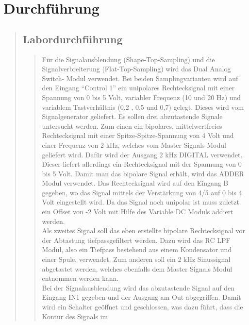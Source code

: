 

\section{Durchführung}
\begin{quote}
    
    
    \subsection{Labordurchführung}
    \begin{quote}
     Für die Signalausblendung (Shape-Top-Sampling) und die Signalverbreiterung (Flat-Top-Sampling) wird das Dual
     Analog Switch- Modul verwendet.
     Bei beiden Samplingvarianten wird auf den Eingang "`Control 1"' ein unipolares Rechtecksignal mit einer Spannung von 0
     bis 5 Volt, variabler Frequenz (10 und 20 Hz) und variablem Tastverhältnis (0,2 , 0,5 und 0,7) gelegt. Dieses wird
     vom Signalgenerator geliefert.
     Es sollen drei abzutastende Signale untersucht werden. Zum einen ein bipolares, mittelwertfreies Rechtecksignal mit
     einer Spitze-Spitze-Spannung von 4 Volt und einer Frequenz von 2 kHz, welches vom Master Signals Modul geliefert
     wird. Dafür wird der Ausgang 2 kHz DIGITAL verwendet. Dieser liefert allerdings ein Rechtecksignal mit der Spannung
     von 0 bis 5 Volt. Damit man das bipolare Signal erhält, wird das ADDER Modul verwendet. Das Rechtecksignal wird auf
     den Eingang B gegeben, wo das Signal mittels der Verstärkung von 4/5 auf 0 bis 4 Volt eingestellt wird. Da das
     Signal noch unipolar ist muss zuletzt ein Offset von -2 Volt mit Hilfe des Variable DC Moduls addiert
     werden.\\
     \noindent\hspace*{4mm}
     Als zweites Signal soll das eben erstellte bipolare Rechtecksignal vor der Abtastung tiefpassgefiltert werden. Dazu
     wird das RC LPF Modul, also ein Tiefpass bestehend aus einem Kondensator und einer Spule, verwendet.
     Zum anderen soll ein 2 kHz Sinussignal abgetastet werden, welches ebenfalls dem Master Signals Modul entnommen
     werden kann.\\
     \noindent\hspace*{4mm}
     Bei der Signalausblendung wird das abzutastende Signal auf den Eingang IN1 gegeben und der Ausgang am Out
     abgegriffen. Damit wird ein Schalter geöffnet und geschlossen, was dazu führt, dass die Kontur des Signals im

\end{quote}
\end{quote}
